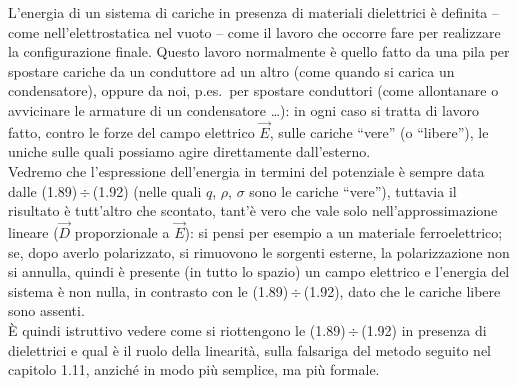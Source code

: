 L'energia di un sistema di cariche in presenza di materiali dielettrici \`e
definita -- come nell'elettrostatica nel vuoto -- come il lavoro che occorre
fare per realizzare la configurazione finale. Questo lavoro normalmente \`e
quello fatto da una pila per spostare cariche da un conduttore ad un altro (come
quando si carica un condensatore), oppure da noi,
p.es.\ per spostare conduttori (come allontanare o avvicinare le armature di un
condensatore \dots): in ogni caso si tratta di lavoro fatto, contro le forze del
campo elettrico $\vec E$, sulle cariche ``vere'' (o ``libere''), le uniche sulle
quali possiamo agire direttamente dall'esterno.\\
Vedremo che l'espressione dell'energia in termini del potenziale \`e sempre data
dalle (1.89)\,$\div$\,(1.92) (nelle quali $q$, $\rho$, $\sigma$ sono le cariche
``vere''), tuttavia il risultato \`e tutt'altro che scontato, tant'\`e vero che
vale solo nell'approssimazione lineare ($\vec D$ proporzionale a $\vec E$): si
pensi per esempio a un materiale ferroelettrico; se, dopo averlo polarizzato, si
rimuovono le sorgenti esterne, la polarizzazione non si annulla, quindi \`e
presente (in tutto lo spazio) un campo elettrico e l'energia del sistema \`e non
nulla, in contrasto con le (1.89)\,$\div$\,(1.92), dato che le cariche libere
sono assenti.\\
\`E quindi istruttivo vedere come si riottengono le (1.89)\,$\div$\,(1.92) in
presenza di dielettrici e qual \`e il ruolo della linearit\`a, sulla falsariga
del metodo seguito nel capitolo 1.11, anzich\'e in modo pi\`u semplice, ma pi\`u
formale.

